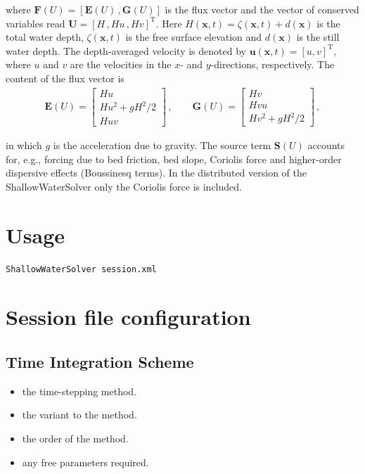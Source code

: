 where $\mathbf F(U) = \left[{\mathbf E(U)}\,, {\mathbf G(U)} \right]$ is the
flux vector and the vector of conserved variables read
${\mathbf U}=\left[H\,,Hu\,,Hv \right]^{\mathrm{T}}$. Here 
$H({\mathbf x},t)=\zeta({\mathbf x},t) + d({\mathbf x})$ is the total
water depth, $\zeta({\mathbf x},t)$ is the free surface elevation and
$d({\mathbf x})$ is the still water depth. The depth-averaged velocity
is denoted by ${\mathbf u}({\mathbf x},t) = \left[u,v\right]^{\mathrm{T}}$,
where $u$ and $v$ are the velocities in the $x$- and
$y$-directions, respectively. The content of the flux vector is
\begin{align*}
{\mathbf E(U)} = \left[ \begin{array}{c} Hu\\Hu^2 +
gH^2/2\\Huv\end{array}\right]\,, \qquad {\mathbf G(U)} = \left[
\begin{array}{c} Hv\\Hvu\\Hv^2 + gH^2/2\end{array}\right]\,,
\end{align*}

in which $g$ is the acceleration due to gravity. The source term
${\mathbf S(U)}$ accounts for, e.g., forcing due to bed
friction, bed slope, Coriolis force and higher-order dispersive effects 
(Boussinesq terms). In the distributed version of the ShallowWaterSolver
only the Coriolis force is included. 

\section{Usage}
\begin{lstlisting}[style=BashInputStyle]
ShallowWaterSolver session.xml
\end{lstlisting}

\section{Session file configuration}

\subsection{Time Integration Scheme}

\begin{itemize}
\item {} the time-stepping method.
\item {} the variant to the method. 
\item {} the order of the method.
\item {} any free parameters required.
\end{itemize}

